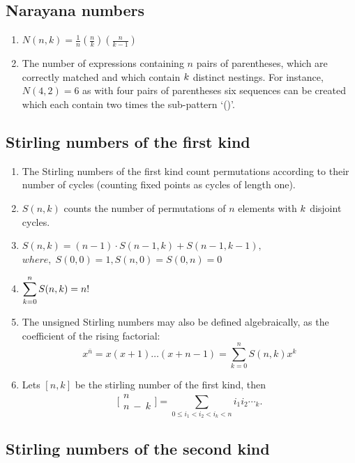 \subsection{Narayana numbers}
\begin{enumerate}[resume]
    \item $N(n,k)=\frac{1}{n}\left(\frac{n}{k}\right)\left(\frac{n}{k-1}\right)$
    \item The number of expressions containing $n$ pairs of parentheses, which are correctly matched and which contain $\displaystyle \displaystyle k$ distinct nestings. For instance, $N(4, 2) = 6$ as with four pairs of parentheses six sequences can be created which each contain two times the sub-pattern ‘()’.
\end{enumerate}

\subsection{Stirling numbers of the first kind}

\begin{enumerate}[resume]
    \item The Stirling numbers of the first kind count permutations according to their number of cycles (counting fixed points as cycles of length one).
    \item $S(n,k)$ counts the number of permutations of $n$ elements with $\displaystyle \displaystyle k$ disjoint cycles.
    \item $S(n,k)=(n-1) \cdot S(n-1,k)+S(n-1,k-1),$
          \(where,\; S(0,0)=1,S(n,0)=S(0,n)=0\)
    \item $\displaystyle \displaystyle\sum_{k=0}^{n}S(n,k) = n!$
    \item The unsigned Stirling numbers may also be defined algebraically, as the coefficient of the rising factorial:
          \[\displaystyle x^{\bar{n}} = x(x+1)\dots(x+n-1) = \sum_{k=0}^{n}{ S(n, k) x^k}\]
    \item Lets $[n, k]$ be the stirling number of the first kind, then
          \[\displaystyle \bigl[\!\begin{smallmatrix} n \\ n\ -\ k \end{smallmatrix}\!\bigr] = \sum_{0 \leq i_1 < i_2 < i_k < n}{i_1i_2\dotsi_k.}\]
\end{enumerate}

\subsection{Stirling numbers of the second kind}

